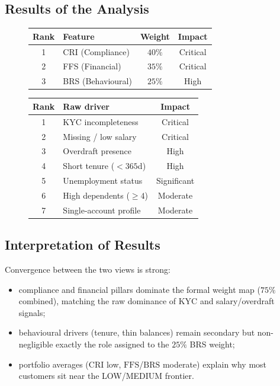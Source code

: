 \subsection{Results of the Analysis}
\begin{figure}[H]
\centering
\begin{minipage}{0.48\textwidth}
  \centering
  \label{tab:feature-importance-pillars}
  \renewcommand{\arraystretch}{1.2}
  \scriptsize
  \begin{tabular}{|c|l|c|c|}
    \hline
    \textbf{Rank} & \textbf{Feature} & \textbf{Weight} & \textbf{Impact} \\
    \hline
    1 & CRI (Compliance) & $40\%$ & Critical \\
    2 & FFS (Financial) & $35\%$ & Critical \\
    3 & BRS (Behavioural) & $25\%$ & High \\
    \hline
  \end{tabular}
\end{minipage}
\hfill
\begin{minipage}{0.48\textwidth}
  \centering
  \label{tab:feature-importance-raw}
  \renewcommand{\arraystretch}{1.2}
  \scriptsize
  \begin{tabular}{|c|l|c|}
    \hline
    \textbf{Rank} & \textbf{Raw driver} & \textbf{Impact} \\
    \hline
    1 & KYC incompleteness & Critical \\
    2 & Missing / low salary & Critical \\
    3 & Overdraft presence & High \\
    4 & Short tenure ($<365$d) & High \\
    5 & Unemployment status & Significant \\
    6 & High dependents ($\ge 4$) & Moderate \\
    7 & Single-account profile & Moderate \\
    \hline
  \end{tabular}
\end{minipage}
\end{figure}

\subsection{Interpretation of Results}
Convergence between the two views is strong:
\begin{itemize}
    \item compliance and financial pillars dominate the formal weight map ($75\%$
          combined), matching the raw dominance of KYC and salary/overdraft signals;
    \item behavioural drivers (tenure, thin balances) remain secondary but
          non-negligible exactly the role assigned to the $25\%$ BRS weight;
    \item portfolio averages ($\mathrm{CRI}$ low, $\mathrm{FFS}$/$\mathrm{BRS}$
          moderate) explain why most customers sit near the LOW/MEDIUM frontier.
\end{itemize}

